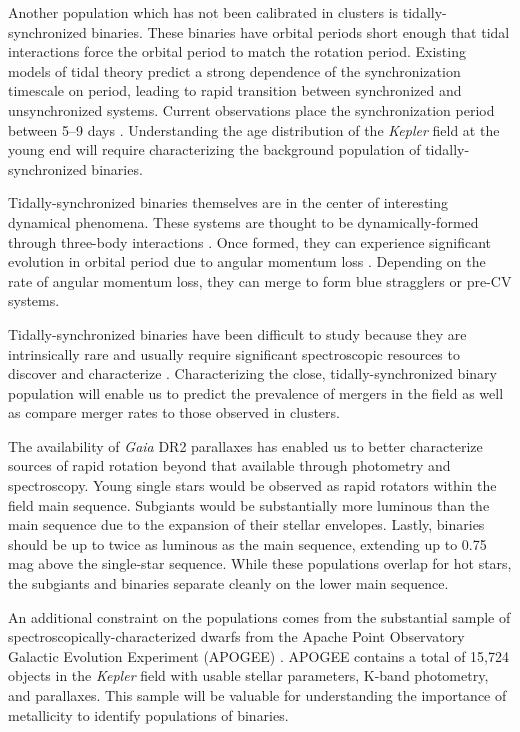 \documentclass[manuscript]{aastex6}
\newcommand{\Kepler}{\mbox{\textit{Kepler}}}
\newcommand{\Gaia}{\mbox{\textit{Gaia}}}
\begin{document}
Another population which has not been calibrated in clusters is
tidally-synchronized binaries. These binaries have orbital periods short enough
that tidal interactions force the orbital period to match the rotation period.
Existing models of tidal theory \citep{Zahn77} predict a strong dependence of 
the synchronization timescale on period, leading to rapid transition between
synchronized and unsynchronized systems. Current observations place the
synchronization period between 5--9 days \citep{Raghavan10}. Understanding the 
age distribution of the \Kepler{} field at the young end will require 
characterizing the background population of tidally-synchronized binaries.

Tidally-synchronized binaries themselves are in the center of interesting
dynamical phenomena. These systems are thought to be dynamically-formed 
through three-body interactions \citep{Tokovinin06, Fabrycky07}. Once formed, they can experience significant
evolution in orbital period due to angular momentum loss \citep{Andronov06}.
Depending on the rate of angular momentum loss, they can merge to form blue 
stragglers or pre-CV systems.

Tidally-synchronized binaries have been difficult to study because they are 
intrinsically rare and usually require significant spectroscopic resources 
to discover and characterize \citep{Mathieu90, Raghavan10, Geller15}. 
Characterizing the close, tidally-synchronized binary population will enable 
us to predict the prevalence of mergers in the field as well as compare merger
rates to those observed in clusters.

The availability of \Gaia{} DR2 parallaxes \citep{Gaia18,Lindegren18} has
enabled us to better characterize sources of rapid rotation beyond that
available through photometry and spectroscopy. Young single stars would be
observed as rapid rotators within the field main sequence. Subgiants would be
substantially more luminous than the main sequence due to the expansion of
their stellar envelopes. Lastly, binaries should be up to twice as luminous as
the main sequence, extending up to 0.75 mag above the single-star sequence.
While these populations overlap for hot stars, the subgiants and binaries
separate cleanly on the lower main sequence.

An additional constraint on the populations comes from the substantial sample
of spectroscopically-characterized dwarfs from the Apache Point Observatory
Galactic Evolution Experiment (APOGEE) \citep{Majewski17}. APOGEE contains a 
total of 15,724 objects in the \Kepler{} field with usable stellar parameters,
K-band photometry, and parallaxes.  This sample will be valuable for 
understanding the importance of metallicity to identify populations of 
binaries.
\end{document}

